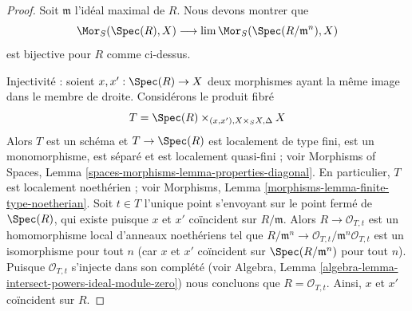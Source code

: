 \begin{proof}
Soit $\mathfrak m$ l'idéal maximal de $R$. Nous devons montrer que
$$
\Mor_S(\Spec(R), X) \longrightarrow \lim \Mor_S(\Spec(R/\mathfrak m^n), X)
$$
est bijective pour $R$ comme ci-dessus.

\medskip\noindent
Injectivité : soient $x, x' : \Spec(R) \to X$
deux morphismes ayant la même image dans le membre de droite.
Considérons le produit fibré
$$
T = \Spec(R) \times_{(x, x'), X \times_S X, \Delta} X
$$
Alors $T$ est un schéma et $T \to \Spec(R)$ est localement de type fini,
est un monomorphisme, est séparé et est localement quasi-fini ; voir
Morphisms of Spaces, Lemma \ref{spaces-morphisms-lemma-properties-diagonal}.
En particulier, $T$ est localement noethérien ; voir
Morphisms, Lemma \ref{morphisms-lemma-finite-type-noetherian}.
Soit $t \in T$ l'unique point s'envoyant sur le point fermé de $\Spec(R)$,
qui existe puisque $x$ et $x'$ coïncident sur $R/\mathfrak m$. Alors
$R \to \mathcal{O}_{T, t}$ est un homomorphisme local d'anneaux noethériens tel que
$R/\mathfrak m^n \to \mathcal{O}_{T, t}/\mathfrak m^n\mathcal{O}_{T, t}$
est un isomorphisme pour tout $n$ (car $x$ et $x'$ coïncident sur
$\Spec(R/\mathfrak m^n)$ pour tout $n$). Puisque $\mathcal{O}_{T, t}$
s'injecte dans son complété (voir
Algebra, Lemma \ref{algebra-lemma-intersect-powers-ideal-module-zero})
nous concluons que $R = \mathcal{O}_{T, t}$. Ainsi, $x$ et $x'$ coïncident
sur $R$.


\end{proof}
